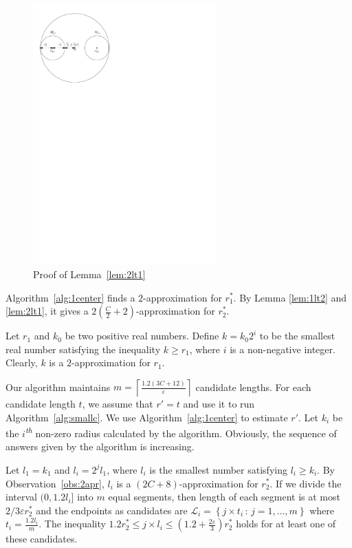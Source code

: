 \documentclass[envcountsame]{cls/cccg15}
\newcommand{\nth}{\textsuperscript{\textit{th}} }
\newcommand{\set}[1]{\left\{ #1 \right\}}
\newcommand{\ceil}[1]{\left\lceil{#1}\right\rceil}
\newcommand{\provided}{\,:\,}
\newcommand{\lee}{\leqslant}
\newcommand{\gee}{\geqslant}
\renewcommand{\le}{\lee}
\renewcommand{\ge}{\gee}
\newcommand{\eps}{\varepsilon}
\begin{document}
\begin{figure}[h]
	\centering
	\includegraphics[width=19em]{figs/2lt1}
	\caption{Proof of Lemma~\ref{lem:2lt1}}
	\label{fig:2lt1}
\end{figure}

Algorithm~\ref{alg:1center} finds a $2$-approximation for $r_1^*$. By Lemma \ref{lem:1lt2} and \ref{lem:2lt1}, it gives a $2\left(\frac{C}{2} + 2\right)$-approximation for $r_2^*$.

\begin{obs}
\label{obs:2apr}
Let $r_1$ and $k_0$ be two positive real numbers. Define $k=k_0 2^i$ to be the smallest real number satisfying the inequality $k \ge r_1$, where $i$ is a non-negative integer. Clearly, $k$ is a $2$-approximation for $r_1$.
\end{obs}


Our algorithm maintains $m=\ceil{\frac{1.2(3C+12)}{\eps}}$ candidate lengths.
For each candidate length $t$, we assume that $r' = t$ and use it to run Algorithm~\ref{alg:smallc}. We use Algorithm~\ref{alg:1center} to estimate $r'$. Let $k_i$ be the $i$\nth non-zero radius calculated by the algorithm. Obviously, the sequence of answers given by the algorithm is increasing.

Let $l_1=k_1$ and $l_i=2^j l_1$, where $l_i$ is the smallest number satisfying $l_i \ge k_i$. By Observation~\ref{obs:2apr}, $l_i$ is a $(2C + 8)$-approximation for $r_2^*$. If we divide the interval $(0, 1.2 l_i]$ into $m$ equal segments, then length of each segment is at most $2/3 \eps r_2^*$ and the endpoints as candidates are $\mathcal{L}_i = \set{j \times t_i \provided j = 1, \dots, m}$ where $t_i = \frac{1.2 l_i}{m}$. 
The inequality $1.2 r_2^* \le j \times l_i \le (1.2 + \frac{2\eps}{3})r_2^*$ holds for at least one of these candidates.
\end{document}
